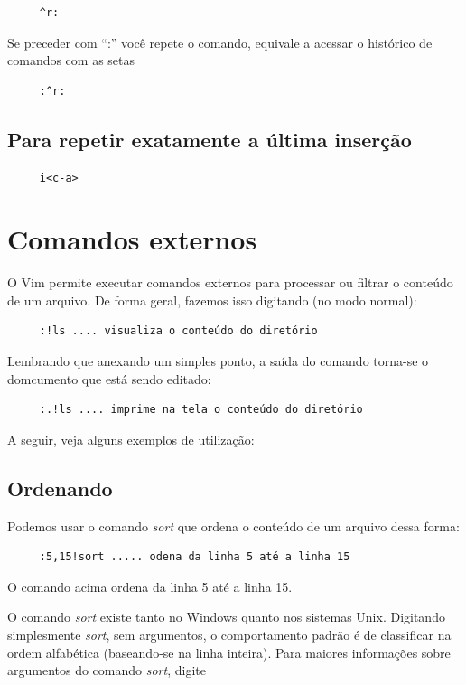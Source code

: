 \documentclass[10pt,a4paper,openany]{book}
\begin{document}
\begin{verbatim}
     ^r:
\end{verbatim}

Se preceder com ``:'' você repete o comando, equivale a acessar o histórico de
comandos com as setas

\begin{verbatim}
     :^r:
\end{verbatim}

\section{Para repetir exatamente a última inserção }

\begin{verbatim}
     i<c-a>
\end{verbatim}

\chapter{Comandos externos}
O Vim permite executar comandos externos para processar ou filtrar o
conteúdo de um arquivo. De forma geral, fazemos isso digitando (no
modo normal):

\begin{verbatim}
     :!ls .... visualiza o conteúdo do diretório
\end{verbatim}

Lembrando que anexando um simples ponto, a saída do comando torna-se o 
domcumento que está sendo editado:

\begin{verbatim}
     :.!ls .... imprime na tela o conteúdo do diretório
\end{verbatim}

A seguir, veja alguns exemplos de utilização:

\section{Ordenando}
Podemos usar o comando {\em sort} que ordena o conteúdo de um arquivo dessa forma:

\begin{verbatim}
     :5,15!sort ..... odena da linha 5 até a linha 15
\end{verbatim}

O comando acima ordena da linha 5 até a linha 15.

O comando {\em sort} existe tanto no Windows quanto nos sistemas Unix.
Digitando simplesmente {\em sort}, sem argumentos, o comportamento padrão
é de classificar na ordem alfabética (baseando-se na linha inteira).
Para maiores informações sobre argumentos do comando {\em sort}, digite
\end{document}
